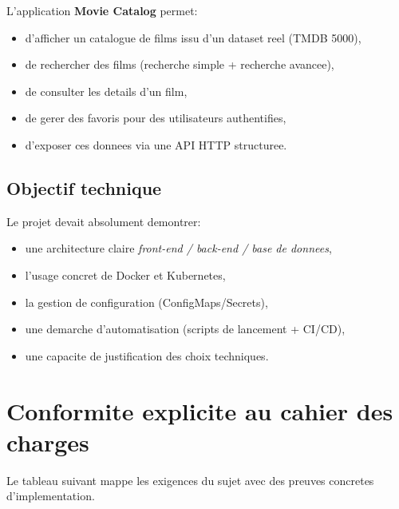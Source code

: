 \documentclass[11pt,a4paper]{article}
\begin{document}
L'application \textbf{Movie Catalog} permet:
\begin{itemize}
  \item d'afficher un catalogue de films issu d'un dataset reel (TMDB 5000),
  \item de rechercher des films (recherche simple + recherche avancee),
  \item de consulter les details d'un film,
  \item de gerer des favoris pour des utilisateurs authentifies,
  \item d'exposer ces donnees via une API HTTP structuree.
\end{itemize}

\subsection{Objectif technique}

Le projet devait absolument demontrer:
\begin{itemize}
  \item une architecture claire \textit{front-end / back-end / base de donnees},
  \item l'usage concret de Docker et Kubernetes,
  \item la gestion de configuration (ConfigMaps/Secrets),
  \item une demarche d'automatisation (scripts de lancement + CI/CD),
  \item une capacite de justification des choix techniques.
\end{itemize}

\section{Conformite explicite au cahier des charges}

Le tableau suivant mappe les exigences du sujet avec des preuves concretes d'implementation.
\end{document}
